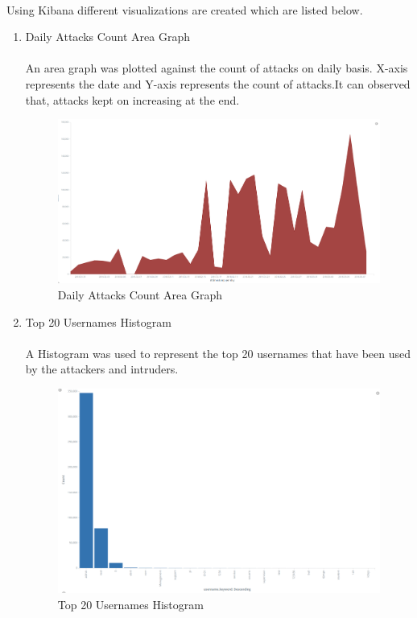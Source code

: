 \documentclass{report}
\begin{document}
\paragraph{}
Using Kibana different visualizations are created which are listed below.
\begin{enumerate}
\item Daily Attacks Count Area Graph
\paragraph{}
An area graph was plotted against the count of attacks on daily basis. X-axis represents the date and Y-axis represents the count of attacks.It can observed that, attacks kept on increasing at the end.

\begin{figure}[H]
\centering
\caption{Daily Attacks Count Area Graph}
\includegraphics[scale=0.2]{Daily_Attacks_Count}
\end{figure}


\item Top 20 Usernames Histogram
\paragraph{}
A Histogram was used to represent the top 20 usernames that have been used by the attackers and intruders.

\begin{figure}[H]
\centering
\caption{Top 20 Usernames Histogram}
\includegraphics[scale=0.2]{Username_Histogram}
\end{figure}


\end{enumerate}
\end{document}
